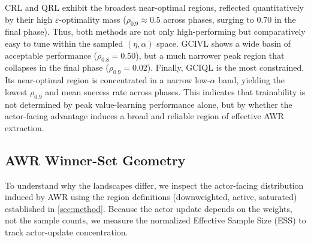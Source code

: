 CRL and QRL exhibit the broadest near-optimal regions, reflected quantitatively by their high \(\varepsilon\)-optimality mass ($\rho_{0.9}\approx 0.5$ across phases, surging to $0.70$ in the final phase). Thus, both methods are not only high-performing but comparatively easy to tune within the sampled \((\eta,\alpha)\) space.
GCIVL shows a wide basin of acceptable performance ($\rho_{0.8} = 0.50$), but a much narrower peak region that collapses in the final phase ($\rho_{0.9} = 0.02$).
Finally, GCIQL is the most constrained. Its near-optimal region is concentrated in a narrow low-\(\alpha\) band, yielding the lowest \(\rho_{0.9}\) and mean success rate across phases.
This indicates that trainability is not determined by peak value-learning performance alone, but by whether the actor-facing advantage induces a broad and reliable region of effective AWR extraction.


\subsection{AWR Winner-Set Geometry}
\label{sec:experiments:awr_geometry}

To understand why the landscapes differ, we inspect the actor-facing distribution induced by AWR using the region definitions (downweighted, active, saturated) established in \cref{sec:method}. Because the actor update depends on the weights, not the sample counts, we measure the normalized Effective Sample Size (ESS) to track actor-update concentration.

%

